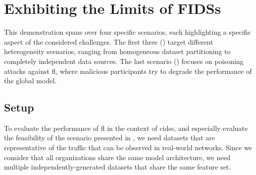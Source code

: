 \section{Exhibiting the Limits of FIDSs\label{sec:demo}}

This demonstration spans over four specific scenarios, each highlighting a specific aspect of the considered challenges.
The first three () target different heterogeneity scenarios, ranging from homogeneous dataset partitioning to completely independent data sources.
The last scenario () focuses on poisoning attacks against \gls{fl}, where malicious participants try to degrade the performance of the global model.


\subsection{Setup\label{sec:demo.setup}}

To evaluate the performance of \gls{fl} in the context of \glspl{cids}, and especially evaluate the feasibility of the scenario presented in , we need datasets that are representative of the traffic that can be observed in real-world networks.
Since we consider that all organizations share the same model architecture, we need multiple independently-generated datasets that share the same feature set.

